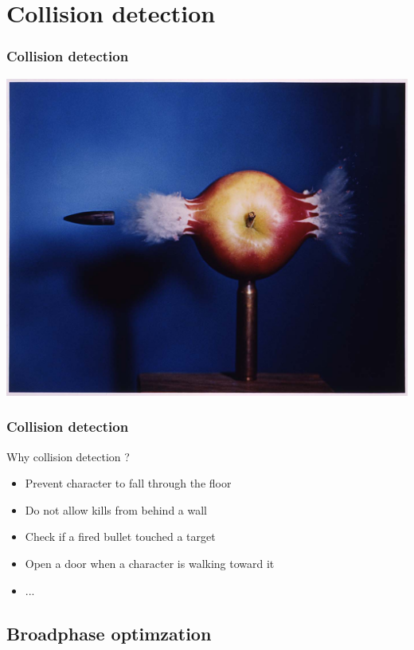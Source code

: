 \documentclass{beamer}
\begin{document}
\section{Collision detection}

\begin{frame}
 \frametitle{Collision detection}
 \includegraphics[width=\textwidth]{apple.jpg}
\end{frame}


\begin{frame}
  \frametitle{Collision detection}
  
  \begin{block}{Why collision detection ?}
    \begin{itemize}
    \item Prevent character to fall through the floor
    \item Do not allow kills from behind a wall
    \item Check if a fired bullet touched a target
    \item Open a door when a character is walking toward it
    \item ...
    \end{itemize}
  \end{block}
  
\end{frame}
\subsection{Broadphase optimzation}
\end{document}
